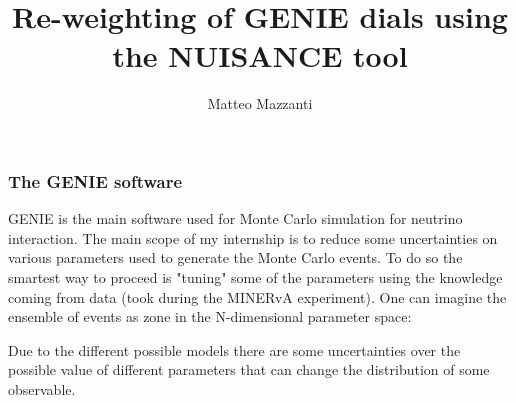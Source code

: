 \documentclass[usenames,dvipsnames]{beamer}
\begin{document}
	
	
	\newcommand\marktopleft[1]{%
		\tikz[overlay,remember picture] 
		\node (marker-#1-a) at (.1em,.3em) {};%
	}
	\newcommand\markbottomright[1]{%
		\tikz[overlay,remember picture] 
		\node (marker-#1-b) at (.1em,.3em) {};%
		\tikz[overlay,remember picture,inner sep=3pt]
		\node[draw=red,rounded corners,fit=(marker-#1-a.north west) (marker-#1-b.south east)] {};%
	}
	
	\title[Re-weighting of GENIE dials using the NUISANCE tool] %
	{Re-weighting of GENIE dials using the NUISANCE tool}
	
	\author[Matteo Mazzanti]{Matteo Mazzanti}
		\frame{\titlegraphic{}
		\titlepage}
	\begin{frame}
	

	
	
		\frametitle{The GENIE software}
		GENIE is the main software used for Monte Carlo simulation for neutrino interaction. The main scope of my internship is to reduce some uncertainties on various parameters used to generate the Monte Carlo events. To do so the smartest way to proceed is "tuning" some of the parameters using the knowledge coming from data (took during the MINERvA experiment).
		One can imagine the ensemble of events as zone in the N-dimensional parameter space:
		
		Due to the different possible models there are some uncertainties over the possible value of different parameters that can change the distribution of some observable.
	\end{frame}
\end{document}
